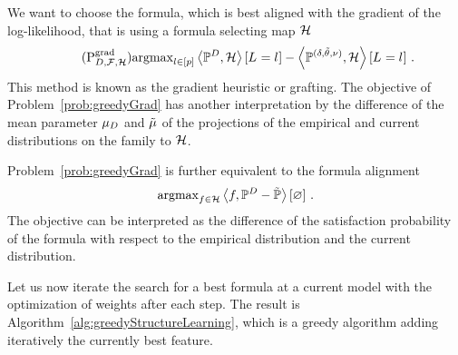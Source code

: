 We want to choose the formula, which is best aligned with the gradient of the log-likelihood, that is using a formula selecting map $\mathcal{H}$
\begin{align}
    \label{prob:greedyGrad} \tag{$\mathrm{P}^{\mathrm{grad}}_{\datamap,\formulaset,\fselectionmap}$}
    \argmax_{\selindex\in[\seldim]} \contractionof{\empdistribution,\fselectionmap}{\indexedselvariable}
    - \contractionof{\expdistof{(\naivestat, \naivecanparam, \basemeasure)},\fselectionmap}{\indexedselvariable} \, .
\end{align}
This method is known as the gradient heuristic or grafting.
The objective of Problem~\eqref{prob:greedyGrad} has another interpretation by the difference of the mean parameter $\mu_{D}$ and $\tilde{\mu}$ of the projections of the empirical and current distributions on the family to $\mathcal{H}$. %

Problem~\eqref{prob:greedyGrad} is further equivalent to the formula alignment
\begin{align*}
    \mathrm{argmax}_{f\in\mathcal{H}} \left\langle f,\mathbb{P}^{D}-\tilde{\mathbb{P}}\right\rangle \left[ \varnothing \right] \, .
\end{align*}
The objective can be interpreted as the difference of the satisfaction probability of the formula with respect to the empirical distribution and the current distribution.













Let us now iterate the search for a best formula at a current model with the optimization of weights after each step.
The result is Algorithm~\ref{alg:greedyStructureLearning}, which is a greedy algorithm adding iteratively the currently best feature.


